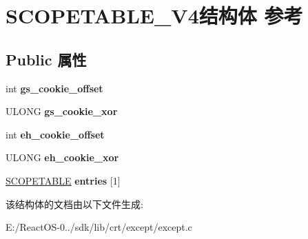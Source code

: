 \hypertarget{struct_s_c_o_p_e_t_a_b_l_e___v4}{}\section{S\+C\+O\+P\+E\+T\+A\+B\+L\+E\+\_\+\+V4结构体 参考}
\label{struct_s_c_o_p_e_t_a_b_l_e___v4}
\subsection*{Public 属性}
\begin{DoxyCompactItemize}
\item 
\mbox{\label{struct_s_c_o_p_e_t_a_b_l_e___v4_a7a1914cd0dd1c3f407376f845e1e97dd}} 
int {\bfseries gs\+\_\+cookie\+\_\+offset}
\item 
\mbox{\label{struct_s_c_o_p_e_t_a_b_l_e___v4_a3daa514a2f756e36c493bebec198749e}} 
U\+L\+O\+NG {\bfseries gs\+\_\+cookie\+\_\+xor}
\item 
\mbox{\label{struct_s_c_o_p_e_t_a_b_l_e___v4_a7596c1766c07788a81553cda4579c086}} 
int {\bfseries eh\+\_\+cookie\+\_\+offset}
\item 
\mbox{\label{struct_s_c_o_p_e_t_a_b_l_e___v4_ae7db5c40fd5185e817a775c4d948b1ed}} 
U\+L\+O\+NG {\bfseries eh\+\_\+cookie\+\_\+xor}
\item 
\mbox{\label{struct_s_c_o_p_e_t_a_b_l_e___v4_a9ca20201bc59c15f6f58082ddfd37b24}} 
\hyperlink{struct___s_c_o_p_e_t_a_b_l_e}{S\+C\+O\+P\+E\+T\+A\+B\+LE} {\bfseries entries} \mbox{[}1\mbox{]}
\end{DoxyCompactItemize}


该结构体的文档由以下文件生成\+:\begin{DoxyCompactItemize}
\item 
E\+:/\+React\+O\+S-\/0../sdk/lib/crt/except/except.\+c\end{DoxyCompactItemize}
